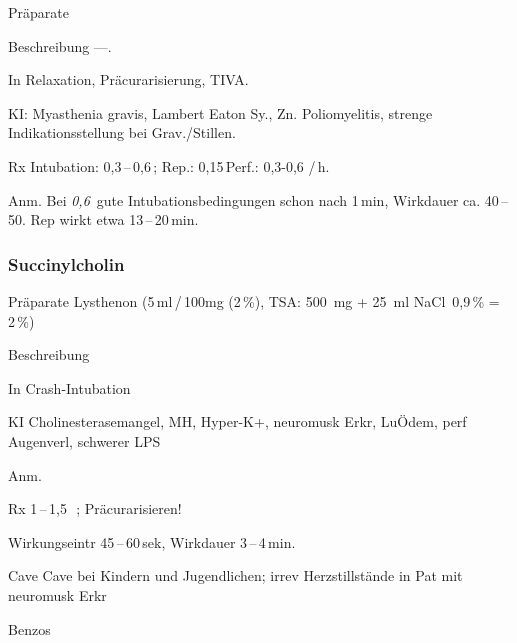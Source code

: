 \begin{labeling}[:]{mm}
  \item[Präparate] 
  \item[Beschreibung] ---.
  \item[In]Relaxation, Präcurarisierung, TIVA.
  \item[KI:]Myasthenia gravis, Lambert Eaton Sy., Zn.
  Poliomyelitis, strenge Indikationsstellung bei Grav./Stillen.
  \item[Rx] Intubation: 0,3\,--\,0,6\,; Rep.:
  0,15\,\newline Perf.: 0,3-0,6\,\,/\,h.
  \item[Anm.] Bei \textit{0,6\,} gute Intubationsbedingungen schon nach
  1\,min, Wirkdauer ca. 40\,--\,50{\textquotesingle}. Rep wirkt
  etwa 13\,--\,20\,min.
\end{labeling}



\subsubsection{Succinylcholin}
\begin{labeling}[:]{mm}
  \item[Präparate] Lysthenon (5\,ml\,/\,100mg (2\,\%), TSA: 500~mg + 25~ml NaCl~0,9\,\% = 2\,\%)
  \item[Beschreibung] 
  \item[In] Crash-Intubation
  \item[KI] Cholinesterasemangel, MH, Hyper-K+, neuromusk
Erkr, LuÖdem, perf Augenverl, schwerer LPS
\item[Anm.] \item[Rx] 1\,--\,1,5~\,;
Präcurarisieren!


Wirkungseintr 45\,--\,60\,sek, Wirkdauer 3\,--\,4\,min.
\item[Cave] Cave bei Kindern und Jugendlichen; irrev Herzstillstände in Pat mit
neuromusk Erkr
\end{labeling}






Benzo{\textquotesingle}s


